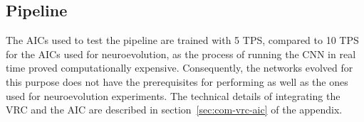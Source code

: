 \subsection{Pipeline}
The AICs used to test the pipeline are trained with 5 TPS, compared to 10 TPS for the AICs used for neuroevolution, as the process of running the CNN in real time proved computationally expensive. Consequently, the networks evolved for this purpose does not have the prerequisites for performing as well as the ones used for neuroevolution experiments. The technical details of integrating the VRC and the AIC are described in section~\ref{sec:com-vrc-aic} of the appendix.









































